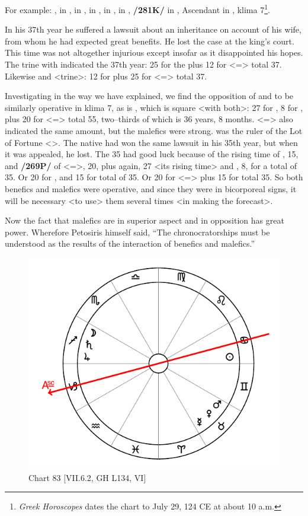 For example: \Sun, \Moon\xspace in \Leo, \Saturn\xspace in \Virgo, \Jupiter\xspace in \Pisces, \Mars\xspace in \Sagittarius, \Venus\xspace in \Gemini, \textbf{/281K/} \Mercury\xspace in \Cancer, Ascendant in \Libra, klima 7\footnote{\textit{Greek Horoscopes} dates the chart to July 29, 124 CE at about 10 a.m.}. 

In his 37th year he suffered a lawsuit about an inheritance on account of his wife, from whom he had expected great benefits. He lost the case at the king’s court. This time was not altogether injurious except insofar as it disappointed his hopes. The \Moon\xspace trine with \Mars\xspace indicated the 37th year: 25 for the \Moon\xspace plus 12 for \Sagittarius\xspace <=\Jupiter> total 37. Likewise \Jupiter\xspace and \Mercury\xspace <trine>: 12 for \Jupiter\xspace plus 25 for \Cancer\xspace <=\Moon> total 37. 

Investigating in the way we have explained, we find the opposition of \Mars\xspace and \Venus\xspace to be similarly operative in klima
7, as is \Saturn, which is square <with both>: 27 for \Gemini, 8 for \Venus, plus 20 for \Virgo <=\Mercury> total 55, two--thirds of which is 36 years, 8 months. \Pisces\xspace <=\Saturn> also indicated the same amount, but the malefics were strong. \Venus\xspace was the ruler of the Lot of Fortune <\Libra>. The native had won the same lawsuit in his 35th year, but when it was appealed, he lost. The 35 had good luck because of the rising time of \Pisces, 15, and \textbf{/269P/} of \Gemini\xspace <=\Mercury>, 20, plus \Gemini\xspace again, 27 <its rising time> and \Venus, 8, for a total of 35. Or 20 for \Gemini, and 15 for \Mars\xspace total of 35. Or 20 for \Virgo\xspace <=\Mercury> plus 15 for \Mars\xspace total 35. So both benefics and malefics were operative, and since they were in bicorporeal signs, it will be necessary <to use> them several times <in making the forecast>. 

Now \mndl the fact that malefics are in superior aspect and in opposition has great power. Wherefore Petosiris himself said, “The chronocratorships must be understood as the results of the interaction of benefics and malefics.” 

\newpage
\begin{figure}
\centering
\vspace{0pt}
\includegraphics[width=.68\textwidth]{charts/7_6_02}
\caption{Chart 83 [VII.6.2, GH L134, VI]}
\label{fig:chart83}
\end{figure} 

